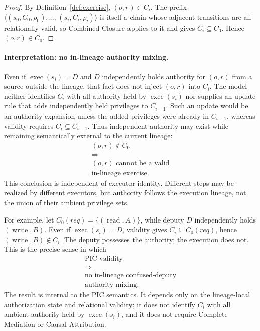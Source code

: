 \documentclass[10pt,twocolumn]{article}
\newcommand{\exec}{\operatorname{exec}}
\begin{document}
\begin{proof}
By Definition~\ref{def:exercise}, \((o,r)\in C_i\). The prefix
\(\langle(s_0,C_0,\rho_0),\ldots,(s_i,C_i,\rho_i)\rangle\) is itself a chain
whose adjacent transitions are all relationally valid, so Combined Closure
applies to it and gives \(C_i\subseteq C_0\). Hence \((o,r)\in C_0\).
\end{proof}

\paragraph{Interpretation: no in-lineage authority mixing.}
Even if \(\exec(s_i)=D\) and \(D\) independently holds authority for \((o,r)\)
from a source outside the lineage, that fact does not inject \((o,r)\) into
\(C_i\). The model neither identifies \(C_i\) with all authority held by
\(\exec(s_i)\) nor supplies an update rule that adds independently held
privileges to \(C_{i-1}\). Such an update would be an authority expansion unless
the added privileges were already in \(C_{i-1}\), whereas validity requires
\(C_i\subseteq C_{i-1}\). Thus independent authority may exist while remaining
semantically external to the current lineage:
\[
\boxed{
\begin{gathered}
(o,r)\notin C_0\\
\Longrightarrow\\
(o,r)\text{ cannot be a valid}\\
\text{in-lineage exercise}.
\end{gathered}
}
\]
This conclusion is independent of executor identity. Different steps may be
realized by different executors, but authority follows the execution lineage,
not the union of their ambient privilege sets.

For example, let \(C_0(req)=\{(\operatorname{read},A)\}\), while deputy \(D\)
independently holds \((\operatorname{write},B)\). Even if
\(\exec(s_i)=D\), validity gives \(C_i\subseteq C_0(req)\), hence
\((\operatorname{write},B)\notin C_i\). The deputy possesses the authority; the
execution does not. This is the precise sense in which
\[
\boxed{
\begin{gathered}
\text{PIC validity}\\
\Longrightarrow\\
\text{no in-lineage confused-deputy}\\
\text{authority mixing}.
\end{gathered}
}
\]
The result is internal to the PIC semantics. It depends only on the
lineage-local authorization state and relational validity; it does not identify
\(C_i\) with all ambient authority held by \(\exec(s_i)\), and it does not
require Complete Mediation or Causal Attribution.
\end{document}
